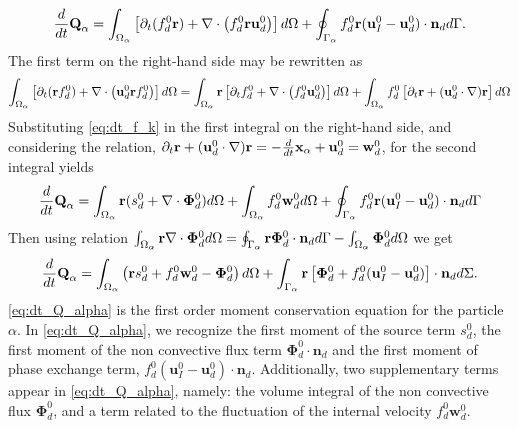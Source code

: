 \begin{equation}
    \frac{d}{dt} \textbf{Q}_\alpha
      =  \int_{\Omega_{\alpha}} \left[
        \partial_t(  f_d^0\textbf{r})
        + \mathbf{\nabla}\cdot \left(  f_d^0 \textbf{r}\textbf{u}_d^0\right)
    \right] d\Omega 
    + \oint_{\Gamma_{\alpha}}   f_d^0 \textbf{r}  (\textbf{u}_I^0-\textbf{u}_d^0)\cdot \textbf{n}_d d\Gamma.
\end{equation}
The first term on the right-hand side may be rewritten as
\begin{equation}
\int_{\Omega_{\alpha}}  \left[
        \partial_t(\textbf{r}  f_d^0)+ \mathbf{\nabla}\cdot \left( \textbf{u}_d^0 \textbf{r} f^0_d\right) 
    \right] d\Omega
    = \int_{\Omega_{\alpha}} \textbf{r}\left[
        \partial_t f_d^0
        + \mathbf{\nabla}\cdot \left(f_d^0 \textbf{u}_d^0\right)
    \right]  d\Omega
    + \int_{\Omega_{\alpha}}  f_d^0 \left[
        \partial_t \textbf{r}
        +(\textbf{u}_d^0 \cdot \mathbf{\nabla}) \textbf{r}
    \right] d\Omega
\end{equation}
Substituting \ref{eq:dt_f_k} in the first integral on the right-hand side, and considering the relation,
$  \partial_t \textbf{r}
+ (\textbf{u}_d^0 \cdot \mathbf{\nabla}) \textbf{r}
= - \frac{d}{dt} \textbf{x}_\alpha  + \textbf{u}_d^0 
= \textbf{w}_d^0$,
for the second integral yields 
\begin{align}
    \frac{d}{dt} \textbf{Q}_\alpha = \int_{\Omega_{\alpha}} \textbf{r} (s_d^0 +\mathbf{\nabla}\cdot \bm\Phi_d^0)   d\Omega
    + \int_{\Omega_{\alpha}}  f_d^0\textbf{w}_d^0  d\Omega  + \oint_{\Gamma_{\alpha}}   f_d^0 \textbf{r}  (\textbf{u}_I^0-\textbf{u}_d^0)\cdot \textbf{n}_d d\Gamma
\end{align}
Then using relation $\int_{\Omega_{\alpha}} \textbf{r}  \mathbf{\nabla}\cdot \bm\Phi_d^0  d\Omega
= \oint_{\Gamma_{\alpha}}  \textbf{r} \bm\Phi_d^0 \cdot \textbf{n}_d  d\Gamma
- \int_{\Omega_{\alpha}}  \bm\Phi_d^0  d\Omega$ we get
\begin{align}
    \frac{d}{dt} \textbf{Q}_\alpha
    = \int_{\Omega_{\alpha}} \left( 
        \textbf{r} s_d^0  
        + f_d^0  \textbf{w}_d^0
        - \bm\Phi_d^0
    \right)  d\Omega
    + \int_{\Gamma_\alpha} \textbf{r} \left[
        \bm\Phi_d^0
        + f_d^0 (\textbf{u}_I^0-\textbf{u}_d^0)
    \right]\cdot \textbf{n}_d  d\Sigma.
    \label{eq:dt_Q_alpha}
\end{align}
 \ref{eq:dt_Q_alpha} is the first order moment conservation equation for the particle $\alpha$. 
 In \ref{eq:dt_Q_alpha}, we recognize the first moment of the source term $s_d^0$, the first moment of the non convective flux term $\bm\Phi_d^0\cdot\textbf{n}_d$ and the first moment of phase exchange term, $f_d^0 (\textbf{u}_I^0-\textbf{u}_d^0)\cdot\textbf{n}_d$. 
 Additionally, two supplementary terms appear in \ref{eq:dt_Q_alpha}, namely: the volume integral of the non convective flux $\bm\Phi_d^0$, and a term related to the fluctuation of the internal velocity $f_d^0 \textbf{w}_d^0$.

